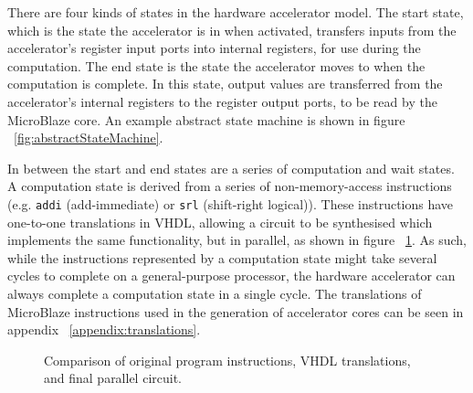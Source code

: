 \documentclass{UoYCSproject}
\begin{document}
There are four kinds of states in the hardware accelerator model. The start state, which is the state the accelerator is in
when activated, transfers inputs from the accelerator's register input ports into internal registers, for use during the
computation. The end state is the state the accelerator moves to when the computation is complete. In this state, output values
are transferred from the accelerator's internal registers to the register output ports, to be read by the MicroBlaze core.
An example abstract state machine is shown in figure ~\ref{fig:abstractStateMachine}.

In between the start and end states are a series of computation and wait states. A computation state is derived from a series of
non-memory-access instructions (e.g. \texttt{addi} (add-immediate) or \texttt{srl} (shift-right logical)).
These instructions have one-to-one translations in VHDL, allowing a circuit to be synthesised which implements the same
functionality, but in parallel, as shown in figure ~\ref{fig:computationState}. As such, while the instructions represented by a
computation state might take several cycles to complete on a general-purpose processor, the hardware accelerator can always
complete a computation state in a single cycle. The translations of MicroBlaze instructions used in the generation of
accelerator cores can be seen in appendix ~\ref{appendix:translations}.

\begin{figure}[H]
\caption{Comparison of original program instructions, VHDL translations, and final parallel circuit.}
\label{fig:computationState}
\end{figure}
\end{document}

